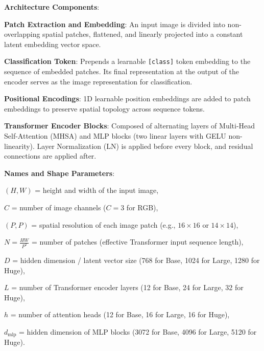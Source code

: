 \begin{dashlist}
    \item \textbf{Architecture Components}:
    \begin{dashlist}
        \item \textbf{Patch Extraction and Embedding}: An input image is divided into non-overlapping spatial patches, flattened, and linearly projected into a constant latent embedding vector space.
        \item \textbf{Classification Token}: Prepends a learnable \texttt{[class]} token embedding to the sequence of embedded patches. Its final representation at the output of the encoder serves as the image representation for classification.
        \item \textbf{Positional Encodings}: 1D learnable position embeddings are added to patch embeddings to preserve spatial topology across sequence tokens.
        \item \textbf{Transformer Encoder Blocks}: Composed of alternating layers of Multi-Head Self-Attention (MHSA) and MLP blocks (two linear layers with GELU non-linearity). Layer Normalization (LN) is applied before every block, and residual connections are applied after.
    \end{dashlist}
    
    \item \textbf{Names and Shape Parameters}:
    \begin{dashlist}
        \item $(H, W)$ = height and width of the input image,
        \item $C$ = number of image channels ($C = 3$ for RGB),
        \item $(P, P)$ = spatial resolution of each image patch (e.g., $16 \times 16$ or $14 \times 14$),
        \item $N = \frac{HW}{P^2}$ = number of patches (effective Transformer input sequence length),
        \item $D$ = hidden dimension / latent vector size (768 for Base, 1024 for Large, 1280 for Huge),
        \item $L$ = number of Transformer encoder layers (12 for Base, 24 for Large, 32 for Huge),
        \item $h$ = number of attention heads (12 for Base, 16 for Large, 16 for Huge),
        \item $d_{\text{mlp}}$ = hidden dimension of MLP blocks (3072 for Base, 4096 for Large, 5120 for Huge).
    \end{dashlist}


\end{dashlist}
